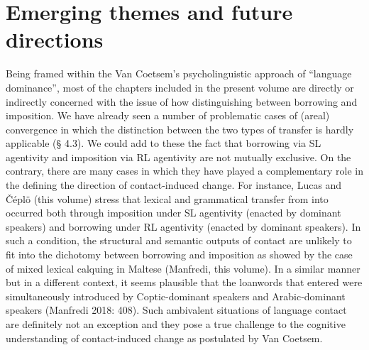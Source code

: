 \documentclass[output=paper]{langsci/langscibook}
\begin{document}
\section{Emerging themes and future directions}\label{introthemes}
Being framed within the Van Coetsem’s psycholinguistic approach of “language dominance”, most of the chapters included in the present volume are directly or indirectly concerned with the issue of how distinguishing between borrowing and imposition. We have already seen a number of problematic cases of (areal) convergence in which the distinction between the two types of transfer is hardly applicable (§ 4.3). We could add to these the fact that borrowing via SL agentivity and imposition via RL agentivity are not mutually exclusive. On the contrary, there are many cases in which they have played a complementary role in the defining the direction of contact-induced change. For instance, Lucas and Čéplö (this volume) stress that lexical and grammatical transfer from  into  occurred both through imposition under SL agentivity (enacted by  dominant speakers) and borrowing under RL agentivity (enacted by  dominant speakers). In such a condition, the structural and semantic outputs of contact are unlikely to fit into the dichotomy between borrowing and imposition as showed by the case of mixed lexical calquing in Maltese (Manfredi, this volume). In a similar manner but in a different context, it seems plausible that the  loanwords that entered  were simultaneously introduced by Coptic-dominant speakers and Arabic-dominant speakers (Manfredi 2018: 408). Such ambivalent situations of language contact are definitely not an exception and they pose a true challenge to the cognitive understanding of contact-induced change as postulated by Van Coetsem.
\end{document}
